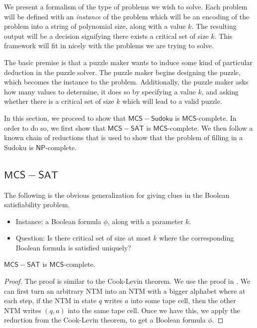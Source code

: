 \documentclass[runningheads,a4paper]{llncs}
\begin{document}
\begin{definition}
We present a formalism of the type of problems we wish to solve. Each problem will be defined with an \emph{instance} of the problem which will be an encoding of the problem into a string of polynomial size, along with a value $k$. The resulting output will be a decision signifying there exists a critical set of size $k$. This framework will fit in nicely with the problems we are trying to solve.

The basic premise is that a puzzle maker wants to induce some kind of particular deduction in the puzzle solver. The puzzle maker begins designing the puzzle, which becomes the instance to the problem. Additionally, the puzzle maker asks how many values to determine, it does so by specifying a value $k$, and asking whether there is a critical set of size $k$ which will lead to a valid puzzle.

In this section, we proceed to show that $\mathsf{MCS-Sudoku}$ is $\mathsf{MCS}$-complete. In order to do so, we first show that $\mathsf{MCS-SAT}$ is $\mathsf{MCS}$-complete. We then follow a known chain of reductions that is used to show that the problem of filling in a Sudoku is $\mathsf{NP}$-complete. 

\subsection{$\mathsf{MCS-SAT}$}
The following is the obvious generalization for giving clues in the Boolean satisfiability problem.

\begin{itemize}
\item Instance: a Boolean formula $\phi$, along with a parameter $k$.
\item Question: Is there critical set of size at most $k$ where the corresponding Boolean formula is satisfied uniquely?
\end{itemize}

\begin{theorem}
$\mathsf{MCS-SAT}$ is $\mathsf{MCS}$-complete.
\end{theorem}

\begin{proof}
The proof is similar to the Cook-Levin theorem. We use the proof in \cite{Garey}. We can first turn an arbitrary NTM into an NTM with a bigger alphabet where at each step, if the NTM in state $q$ writes $a$ into some tape cell, then the other NTM writes $(q,a)$ into the same tape cell. Once we have this, we apply the reduction from the Cook-Levin theorem, to get a Boolean formula $\phi$. 


\end{proof}
\end{definition}
\end{document}
